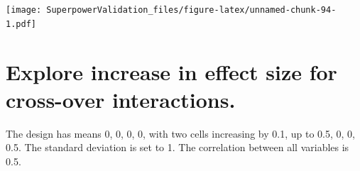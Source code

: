 \documentclass[]{book}
\newenvironment{Shaded}{\begin{snugshade}}{\end{snugshade}}
\newcommand{\DataTypeTok}[1]{\textcolor[rgb]{0.13,0.29,0.53}{#1}}
\newcommand{\FloatTok}[1]{\textcolor[rgb]{0.00,0.00,0.81}{#1}}
\newcommand{\KeywordTok}[1]{\textcolor[rgb]{0.13,0.29,0.53}{\textbf{#1}}}
\newcommand{\NormalTok}[1]{#1}
\newcommand{\OperatorTok}[1]{\textcolor[rgb]{0.81,0.36,0.00}{\textbf{#1}}}
\newcommand{\StringTok}[1]{\textcolor[rgb]{0.31,0.60,0.02}{#1}}
\begin{document}
\begin{Shaded}
\end{Shaded}

\texttt{[image: SuperpowerValidation\_files/figure-latex/unnamed-chunk-94-1.pdf]}

\hypertarget{explore-increase-in-effect-size-for-cross-over-interactions.}{%
\section{Explore increase in effect size for cross-over interactions.}\label{explore-increase-in-effect-size-for-cross-over-interactions.}}

The design has means 0, 0, 0, 0, with two cells increasing by 0.1, up to 0.5, 0, 0, 0.5. The standard deviation is set to 1. The correlation between all variables is 0.5.
\end{document}
